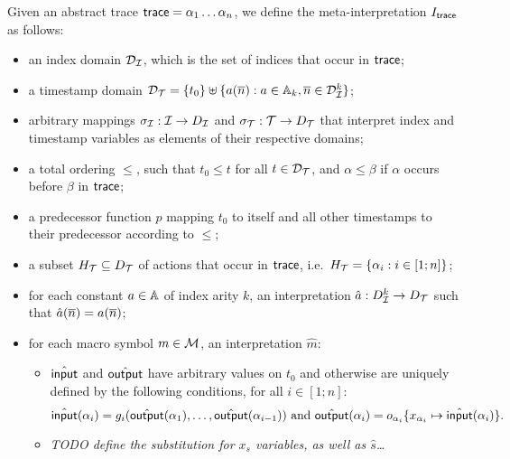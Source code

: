 \begin{definition}
  Given an abstract trace $\textsf{trace} = \alpha_1\ldots\alpha_n$,
  we define the meta-interpretation $I_{\textsf{trace}}$ as follows:
  \begin{itemize}
    \item an index domain $\mathcal{D}_{\mathcal{I}}$, which is the set of indices that occur in $\textsf{trace}$;
    \item a timestamp domain $\mathcal{D}_{\mathcal{T}} = \{ t_0 \} \uplus \{ a(\overline{n}) : a\in\mathbb{A}_k,
      \overline{n}\in\mathcal{D}_{\mathcal{I}}^k \}$;
    \item arbitrary mappings $\sigma_{\mathcal{I}} : \mathcal{I} \to D_{\mathcal{I}}$
      and $\sigma_{\mathcal{T}} : \mathcal{T} \to D_{\mathcal{T}}$ that interpret index and
      timestamp variables as elements of their respective domains;
    \item a total ordering $\leq$, such that $t_0\leq t$ for all $t\in\mathcal{D}_{\mathcal{T}}$,
      and $\alpha\leq\beta$ if $\alpha$ occurs before $\beta$ in $\textsf{trace}$;
    \item a predecessor function $p$ mapping $t_0$ to itself and all
      other timestamps to their predecessor according to $\leq$;
    \item a subset $H_{\mathcal{T}}\subseteq D_{\mathcal{T}}$  of actions that occur in $\textsf{trace}$,
      i.e.\ $H_{\mathcal{T}}=\{\alpha_i : i\in[1;n]\}$;
    \item for each constant $a \in \mathbb{A}$ of index arity $k$,
    an interpretation $\hat{a} : D_{\mathcal{I}}^k \to D_{\mathcal{T}}$ such that
    $\hat{a}(\overline{n}) = a(\overline{n})$;
    \item for each macro symbol $m \in \mathcal{M}$, an interpretation $\hat{m}$:
    \begin{itemize}
      \item $\hat{\textsf{input}}$ and $\hat{\textsf{output}}$ have arbitrary values on
      $t_0$ and otherwise are uniquely defined by the following
      conditions, for all $i\in[1;n]$:
      $$\hat{\textsf{input}}(\alpha_i) =
      g_{i}(\hat{\textsf{output}}(\alpha_1),\ldots,\hat{\textsf{output}}(\alpha_{i-1}))
      \text{ and }
      \hat{\textsf{output}}(\alpha_i) =
      o_{\alpha_i}\{x_{\alpha_i}\mapsto\hat{\textsf{input}}(\alpha_i)\}.$$
      \item \emph{TODO define the substitution for $x_s$ variables,
      as well as $\hat{s}$\ldots}
    \end{itemize}
  \end{itemize}
\end{definition}


